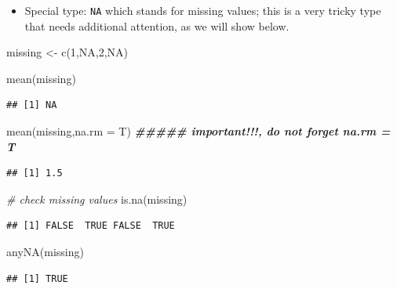\documentclass[
  11pt,
]{book}
\newenvironment{Shaded}{\begin{snugshade}}{\end{snugshade}}
\newcommand{\AttributeTok}[1]{\textcolor[rgb]{0.77,0.63,0.00}{#1}}
\newcommand{\CommentTok}[1]{\textcolor[rgb]{0.56,0.35,0.01}{\textit{#1}}}
\newcommand{\ConstantTok}[1]{\textcolor[rgb]{0.00,0.00,0.00}{#1}}
\newcommand{\DecValTok}[1]{\textcolor[rgb]{0.00,0.00,0.81}{#1}}
\newcommand{\DocumentationTok}[1]{\textcolor[rgb]{0.56,0.35,0.01}{\textbf{\textit{#1}}}}
\newcommand{\FunctionTok}[1]{\textcolor[rgb]{0.00,0.00,0.00}{#1}}
\newcommand{\NormalTok}[1]{#1}
\newcommand{\OtherTok}[1]{\textcolor[rgb]{0.56,0.35,0.01}{#1}}
\providecommand{\tightlist}{%
  \setlength{\itemsep}{0pt}\setlength{\parskip}{0pt}}
\begin{document}
\begin{itemize}
\tightlist
\item
  Special type: \texttt{NA} which stands for missing values; this is a very tricky type that needs additional attention, as we will show below.
\end{itemize}

\begin{Shaded}
\begin{Highlighting}[]
\NormalTok{missing }\OtherTok{\textless{}{-}} \FunctionTok{c}\NormalTok{(}\DecValTok{1}\NormalTok{,}\ConstantTok{NA}\NormalTok{,}\DecValTok{2}\NormalTok{,}\ConstantTok{NA}\NormalTok{)}

\FunctionTok{mean}\NormalTok{(missing)}
\end{Highlighting}
\end{Shaded}

\begin{verbatim}
## [1] NA
\end{verbatim}

\begin{Shaded}
\begin{Highlighting}[]
\FunctionTok{mean}\NormalTok{(missing,}\AttributeTok{na.rm =}\NormalTok{ T) }\DocumentationTok{\#\#\#\#\# important!!!, do not forget na.rm = T}
\end{Highlighting}
\end{Shaded}

\begin{verbatim}
## [1] 1.5
\end{verbatim}

\begin{Shaded}
\begin{Highlighting}[]
\CommentTok{\# check missing values}
\FunctionTok{is.na}\NormalTok{(missing)}
\end{Highlighting}
\end{Shaded}

\begin{verbatim}
## [1] FALSE  TRUE FALSE  TRUE
\end{verbatim}

\begin{Shaded}
\begin{Highlighting}[]
\FunctionTok{anyNA}\NormalTok{(missing)}
\end{Highlighting}
\end{Shaded}

\begin{verbatim}
## [1] TRUE
\end{verbatim}
\end{document}
